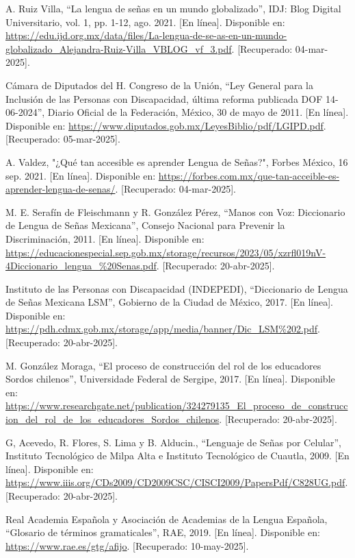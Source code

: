 \begin{thebibliography}{200}
    A. Ruiz Villa, “La lengua de señas en un mundo globalizado”, IDJ: Blog Digital Universitario, vol. 1, pp. 1-12, ago. 2021. [En línea]. Disponible en: \url{https://edu.ijd.org.mx/data/files/La-lengua-de-se-as-en-un-mundo-globalizado_Alejandra-Ruiz-Villa_VBLOG_vf_3.pdf}. [Recuperado: 04-mar-2025].

    Cámara de Diputados del H. Congreso de la Unión, “Ley General para la Inclusión de las Personas con Discapacidad, última reforma publicada DOF 14-06-2024”, Diario Oficial de la Federación, México, 30 de mayo de 2011. [En línea]. Disponible en: \url{https://www.diputados.gob.mx/LeyesBiblio/pdf/LGIPD.pdf}. [Recuperado: 05-mar-2025].

    A. Valdez, "¿Qué tan accesible es aprender Lengua de Señas?", Forbes México, 16 sep. 2021. [En línea]. Disponible en: \url{https://forbes.com.mx/que-tan-acceible-es-aprender-lengua-de-senas/}. [Recuperado: 04-mar-2025].

    M. E. Serafín de Fleischmann y R. González Pérez, “Manos con Voz: Diccionario de Lengua de Señas Mexicana”, Consejo Nacional para Prevenir la Discriminación, 2011. [En línea]. Disponible en: \url{https://educacionespecial.sep.gob.mx/storage/recursos/2023/05/xzrfl019nV-4Diccionario_lengua_%20Senas.pdf}. [Recuperado: 20-abr-2025].

    Instituto de las Personas con Discapacidad (INDEPEDI), “Diccionario de Lengua de Señas Mexicana LSM”, Gobierno de la Ciudad de México, 2017. [En línea]. Disponible en: \url{https://pdh.cdmx.gob.mx/storage/app/media/banner/Dic_LSM%202.pdf}. [Recuperado: 20-abr-2025].

    M. González Moraga, “El proceso de construcción del rol de los educadores Sordos chilenos”, Universidade Federal de Sergipe, 2017. [En línea]. Disponible en: \url{https://www.researchgate.net/publication/324279135_El_proceso_de_construccion_del_rol_de_los_educadores_Sordos_chilenos}. [Recuperado: 20-abr-2025].

    G, Acevedo, R. Flores, S. Lima y B. Alducin., “Lenguaje de Señas por Celular”, Instituto Tecnológico de Milpa Alta e Instituto Tecnológico de Cuautla, 2009. [En línea]. Disponible en: \url{https://www.iiis.org/CDs2009/CD2009CSC/CISCI2009/PapersPdf/C828UG.pdf}. [Recuperado: 20-abr-2025].

    Real Academia Española y Asociación de Academias de la Lengua Española, “Glosario de términos gramaticales”, RAE, 2019. [En línea]. Disponible en: \url{https://www.rae.es/gtg/afijo}. [Recuperado: 10-may-2025].


\end{thebibliography}
